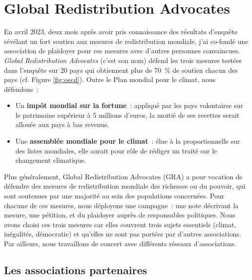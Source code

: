 \documentclass[a5paper,french,openany]{memoir}
\begin{document}
\section{Global Redistribution Advocates}

En avril 2023, deux mois après avoir pris connaissance des résultats d'enquête révélant un fort soutien aux mesures de redistribution mondiale, j'ai co-fondé une association de plaidoyer pour ces mesures avec d'autres personnes convaincues. \textit{Global Redistribution Advocates} (c'est son nom) défend les trois mesures testées dans l'enquête sur 20 pays qui obtiennent plus de 70~\% de soutien chacun des pays (cf. Figure \ref{fig:oecd}). Outre le Plan mondial pour le climat, nous défendons~: 
\begin{itemize}
  \item Un \textbf{impôt mondial sur la fortune}~: appliqué par les pays volontaires sur le patrimoine supérieur à 5 millions d'euros, la moitié de ses recettes serait allouée aux pays à bas revenus.
  \item Une \textbf{assemblée mondiale pour le climat}~: élue à la proportionnelle sur des listes mondiales, elle aurait pour rôle de rédiger un traité sur le changement climatique.
\end{itemize}

Plus généralement, Global Redistribution Advocates (GRA) a pour vocation de défendre des mesures de redistribution mondiale des richesses ou du pouvoir, qui sont soutenues par une majorité au sein des populations concernées. Pour chacune de ces mesures, nous déployons une campagne~: une note décrivant la mesure, une pétition, et du plaidoyer auprès de responsables politiques. Nous avons choisi ces trois mesures car elles couvrent trois sujets essentiels (climat, inégalités, démocratie) et qu'elles ne sont pas portées par d'autres associations. Par ailleurs, nous travaillons de concert avec différents réseaux d'associations. 

\subsection{Les associations partenaires}
\end{document}
